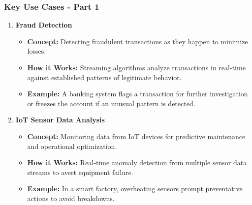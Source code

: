 \documentclass[aspectratio=169]{beamer}
\begin{document}
\begin{frame}[fragile]
    \frametitle{Key Use Cases - Part 1}
    \begin{enumerate}
        \item \textbf{Fraud Detection}
            \begin{itemize}
                \item \textbf{Concept:} Detecting fraudulent transactions as they happen to minimize losses.
                \item \textbf{How it Works:} Streaming algorithms analyze transactions in real-time against established patterns of legitimate behavior.
                \item \textbf{Example:} A banking system flags a transaction for further investigation or freezes the account if an unusual pattern is detected.
            \end{itemize}

        \item \textbf{IoT Sensor Data Analysis}
            \begin{itemize}
                \item \textbf{Concept:} Monitoring data from IoT devices for predictive maintenance and operational optimization.
                \item \textbf{How it Works:} Real-time anomaly detection from multiple sensor data streams to avert equipment failure.
                \item \textbf{Example:} In a smart factory, overheating sensors prompt preventative actions to avoid breakdowns.
            \end{itemize}
    \end{enumerate}
\end{frame}
\end{document}
